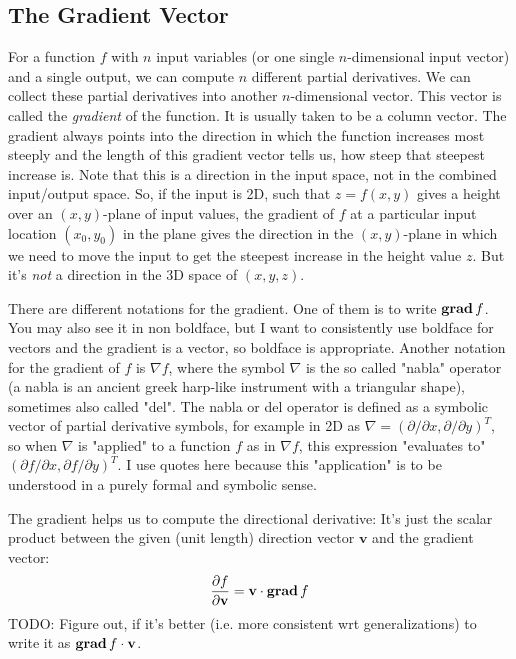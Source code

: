 \subsection{The Gradient Vector}
For a function $f$ with $n$ input variables (or one single $n$-dimensional input vector) and a single output, we can compute $n$ different partial derivatives. We can collect these partial derivatives into another $n$-dimensional vector. This vector is called the \emph{gradient} of the function. It is usually taken to be a column vector. The gradient always points into the direction in which the function increases most steeply and the length of this gradient vector tells us, how steep that steepest increase is. Note that this is a direction in the input space, not in the combined input/output space. So, if the input is 2D, such that $z = f(x,y)$ gives a height over an $(x,y)$-plane of input values, the gradient of $f$ at a particular input location $(x_0,y_0)$ in the plane gives the direction in the $(x,y)$-plane in which we need to move the input to get the steepest increase in the height value $z$. But it's \emph{not} a direction in the 3D space of $(x,y,z)$.

\medskip
There are different notations for the gradient. One of them is to write $\operatorname{\mathbf{grad}} f$. You may also see it in non boldface, but I want to consistently use boldface for vectors and the gradient is a vector, so boldface is appropriate. Another notation for the gradient of $f$ is $\nabla f$, where the symbol $\nabla$ is the so called "nabla" operator (a nabla is an ancient greek harp-like instrument with a triangular shape), sometimes also called "del". The nabla or del operator is defined as a symbolic vector of partial derivative symbols, for example in 2D as $\nabla = (\partial / \partial x, \partial / \partial y)^T$, so when $\nabla$ is "applied" to a function $f$ as in $\nabla f$, this expression "evaluates to" $(\partial f / \partial x, \partial f / \partial y)^T$. I use quotes here because this "application" is to be understood in a purely formal and symbolic sense.

\medskip
The gradient helps us to compute the directional derivative: It's just the scalar product between the given (unit length) direction vector $\mathbf{v}$ and the gradient vector:
\begin{equation}
 \frac{\partial f}{\partial \mathbf{v}} = \mathbf{v} \cdot \operatorname{\mathbf{grad}} f
\end{equation}
TODO: Figure out, if it's better (i.e. more consistent wrt generalizations) to write it as $\operatorname{\mathbf{grad}} f \cdot \mathbf{v}$.

